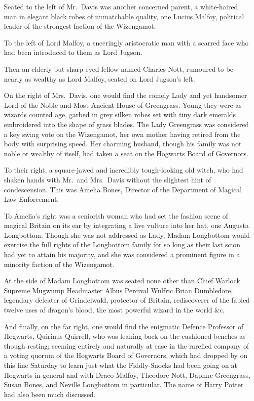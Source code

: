 Seated to the left of Mr.~Davis was another concerned parent, a white-haired
man in elegant black robes of unmatchable quality, one Lucius Malfoy, political
leader of the strongest faction of the Wizengamot.

To the left of Lord Malfoy, a sneeringly aristocratic man with a scarred face
who had been introduced to them as Lord Jugson.

Then an elderly but sharp-eyed fellow named Charles Nott, rumoured to be nearly
as wealthy as Lord Malfoy, seated on Lord Jugson's left.

On the right of Mrs.~Davis, one would find the comely Lady and yet handsomer
Lord of the Noble and Most Ancient House of Greengrass. Young they were as
wizards counted age, garbed in grey silken robes set with tiny dark emeralds
embroidered into the shape of grass blades. The Lady Greengrass was considered
a key swing vote on the Wizengamot, her own mother having retired from the body
with surprising speed. Her charming husband, though his family was not noble or
wealthy of itself, had taken a seat on the Hogwarts Board of Governors.

To their right, a square-jawed and incredibly tough-looking old witch, who had
shaken hands with Mr.~and Mrs.~Davis without the slightest hint of
condescension. This was Amelia Bones, Director of the Department of Magical Law
Enforcement.

To Amelia's right was a seniorish woman who had set the fashion scene of
magical Britain on its ear by integrating a live vulture into her hat, one
Augusta Longbottom. Though she was not addressed as Lady, Madam Longbottom
would exercise the full rights of the Longbottom family for so long as their
last scion had yet to attain his majority, and she was considered a prominent
figure in a minority faction of the Wizengamot.

At the side of Madam Longbottom was seated none other than Chief Warlock
Supreme Mugwump Headmaster Albus Percival Wulfric Brian Dumbledore, legendary
defeater of Grindelwald, protector of Britain, rediscoverer of the fabled
twelve uses of dragon's blood, the most powerful wizard in the world \&c.

And finally, on the far right, one would find the enigmatic Defence Professor
of Hogwarts, Quirinus Quirrell, who was leaning back on the cushioned benches
as though resting; seeming entirely and naturally at ease in the rarefied
company of a voting quorum of the Hogwarts Board of Governors, which had
dropped by on this fine Saturday to learn just what the Fiddly-Snocks had been
going on at Hogwarts in general and with Draco Malfoy, Theodore Nott, Daphne
Greengrass, Susan Bones, and Neville Longbottom in particular. The name of
Harry Potter had also been much discussed.

